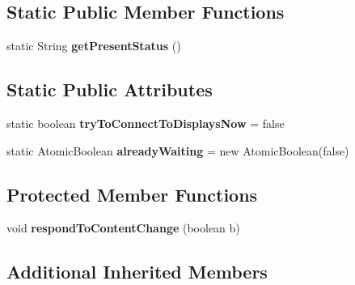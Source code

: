 \subsection*{Static Public Member Functions}
\begin{DoxyCompactItemize}
\item 
\hypertarget{classgov_1_1fnal_1_1ppd_1_1dd_1_1display_1_1DisplayFacade_a78b803ae9cb502e09f8bbd65d7fa741e}{static String {\bfseries get\-Present\-Status} ()}\label{classgov_1_1fnal_1_1ppd_1_1dd_1_1display_1_1DisplayFacade_a78b803ae9cb502e09f8bbd65d7fa741e}

\end{DoxyCompactItemize}
\subsection*{Static Public Attributes}
\begin{DoxyCompactItemize}
\item 
\hypertarget{classgov_1_1fnal_1_1ppd_1_1dd_1_1display_1_1DisplayFacade_a0e46150fb1f40a87bac5060ea85c6dcc}{static boolean {\bfseries try\-To\-Connect\-To\-Displays\-Now} = false}\label{classgov_1_1fnal_1_1ppd_1_1dd_1_1display_1_1DisplayFacade_a0e46150fb1f40a87bac5060ea85c6dcc}

\item 
\hypertarget{classgov_1_1fnal_1_1ppd_1_1dd_1_1display_1_1DisplayFacade_a385e34731c409e71b2cea39b88b7e918}{static Atomic\-Boolean {\bfseries already\-Waiting} = new Atomic\-Boolean(false)}\label{classgov_1_1fnal_1_1ppd_1_1dd_1_1display_1_1DisplayFacade_a385e34731c409e71b2cea39b88b7e918}

\end{DoxyCompactItemize}
\subsection*{Protected Member Functions}
\begin{DoxyCompactItemize}
\item 
\hypertarget{classgov_1_1fnal_1_1ppd_1_1dd_1_1display_1_1DisplayFacade_a9015664f9b644f4d912e5079672933aa}{void {\bfseries respond\-To\-Content\-Change} (boolean b)}\label{classgov_1_1fnal_1_1ppd_1_1dd_1_1display_1_1DisplayFacade_a9015664f9b644f4d912e5079672933aa}

\end{DoxyCompactItemize}
\subsection*{Additional Inherited Members}


